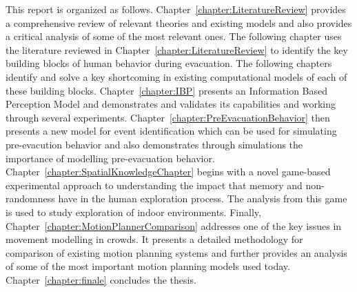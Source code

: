  This report is organized as follows. Chapter~\ref{chapter:LiteratureReview} provides a comprehensive review of relevant theories and existing models and also provides a critical analysis of some of the most relevant ones. The following chapter uses the literature reviewed in Chapter~\ref{chapter:LiteratureReview} to identify the key building blocks of human behavior during evacuation. The following chapters identify and solve a key shortcoming in existing computational models of each of these building blocks.
Chapter~\ref{chapter:IBP} presents an Information Based Perception Model and demonstrates and validates its capabilities and working through several experiments. Chapter~\ref{chapter:PreEvacuationBehavior} then presents a new model for event identification which can be used for simulating pre-evacution behavior and also demonstrates through simulations the importance of modelling pre-evacuation behavior. Chapter~\ref{chapter:SpatialKnowledgeChapter} begins with a novel game-based experimental approach to understanding the impact that memory and non-randomness have in the human exploration process. The analysis from this game is used to study exploration of indoor environments. Finally, Chapter~\ref{chapter:MotionPlannerComparison} addresses one of the key issues in movement modelling in crowds. It presents a detailed methodology for comparison of existing motion planning systems and further provides an analysis of some of the most important motion planning models used today. Chapter~\ref{chapter:finale} concludes the thesis.

